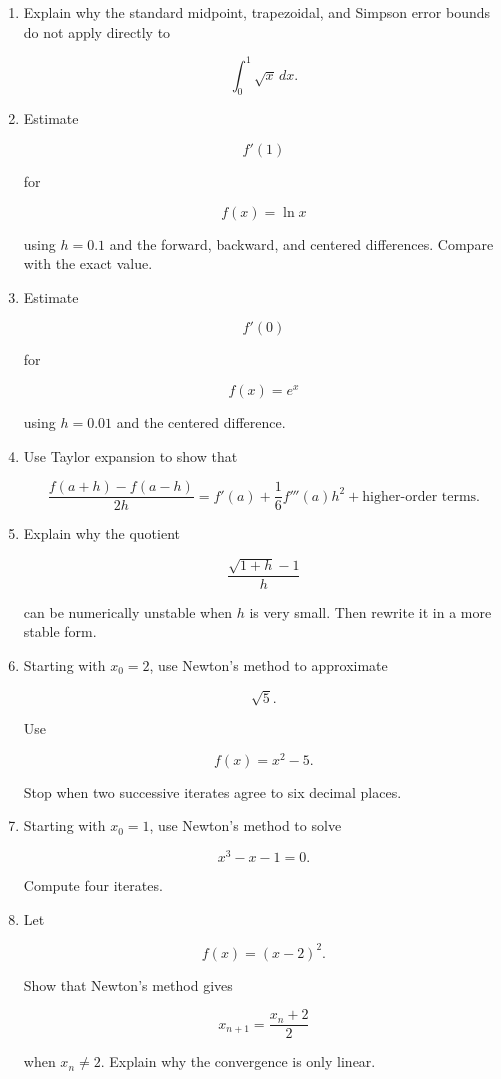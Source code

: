 \begin{enumerate}
\item Explain why the standard midpoint, trapezoidal, and Simpson error bounds do not
apply directly to

\[
\int_0^1 \sqrt{x}\,dx.
\]

\item Estimate

\[
f'(1)
\]

for

\[
f(x)=\ln x
\]

using \(h=0.1\) and the forward, backward, and centered differences.  Compare with
the exact value.

\item Estimate

\[
f'(0)
\]

for

\[
f(x)=e^x
\]

using \(h=0.01\) and the centered difference.

\item Use Taylor expansion to show that

\[
\frac{f(a+h)-f(a-h)}{2h}
=
f'(a)+\frac16 f'''(a)h^2+\text{higher-order terms}.
\]

\item Explain why the quotient

\[
\frac{\sqrt{1+h}-1}{h}
\]

can be numerically unstable when \(h\) is very small.  Then rewrite it in a more
stable form.

\item Starting with \(x_0=2\), use Newton's method to approximate

\[
\sqrt5.
\]

Use

\[
f(x)=x^2-5.
\]

Stop when two successive iterates agree to six decimal places.

\item Starting with \(x_0=1\), use Newton's method to solve

\[
x^3-x-1=0.
\]

Compute four iterates.

\item Let

\[
f(x)=(x-2)^2.
\]

Show that Newton's method gives

\[
x_{n+1}=\frac{x_n+2}{2}
\]

when \(x_n\neq2\).  Explain why the convergence is only linear.


\end{enumerate}
